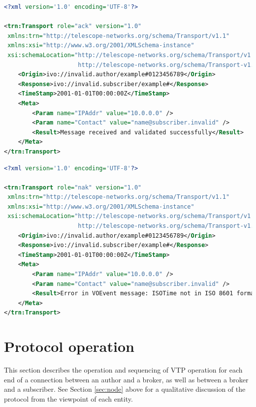 \documentclass[a4paper,11pt]{ivoa}
\begin{document}
\begin{lstlisting}[language=XML,label=lst:ack,
                   caption=Sample VOEvent message receipt response indicating successful transmission (\xmlel{ack}).]
<?xml version='1.0' encoding='UTF-8'?>

<trn:Transport role="ack" version="1.0"
 xmlns:trn="http://telescope-networks.org/schema/Transport/v1.1"
 xmlns:xsi="http://www.w3.org/2001/XMLSchema-instance"
 xsi:schemaLocation="http://telescope-networks.org/schema/Transport/v1.1
                     http://telescope-networks.org/schema/Transport-v1.1.xsd">
    <Origin>ivo://invalid.author/example#0123456789</Origin>
    <Response>ivo://invalid.subscriber/example#</Response>
    <TimeStamp>2001-01-01T00:00:00Z</TimeStamp>
    <Meta>
        <Param name="IPAddr" value="10.0.0.0" />
        <Param name="Contact" value="name@subscriber.invalid" />
        <Result>Message received and validated successfully</Result>
    </Meta>
</trn:Transport>
\end{lstlisting}

\begin{lstlisting}[language=XML,label=lst:nak,
                   caption=Sample VOEvent message receipt response indicating unsuccessful transmission (\xmlel{nak}).]
<?xml version='1.0' encoding='UTF-8'?>

<trn:Transport role="nak" version="1.0"
 xmlns:trn="http://telescope-networks.org/schema/Transport/v1.1"
 xmlns:xsi="http://www.w3.org/2001/XMLSchema-instance"
 xsi:schemaLocation="http://telescope-networks.org/schema/Transport/v1.1
                     http://telescope-networks.org/schema/Transport-v1.1.xsd">
    <Origin>ivo://invalid.author/example#0123456789</Origin>
    <Response>ivo://invalid.subscriber/example#</Response>
    <TimeStamp>2001-01-01T00:00:00Z</TimeStamp>
    <Meta>
        <Param name="IPAddr" value="10.0.0.0" />
        <Param name="Contact" value="name@subscriber.invalid" />
        <Result>Error in VOEvent message: ISOTime not in ISO 8601 format</Result>
    </Meta>
</trn:Transport>
\end{lstlisting}

\section{Protocol operation}
\label{sec:protocol}

This section describes the operation and sequencing of VTP operation for each
end of a connection between an author and a broker, as well as between a
broker and a subscriber. See Section \ref{sec:node} above for a qualitative
discussion of the protocol from the viewpoint of each entity.
\end{document}
